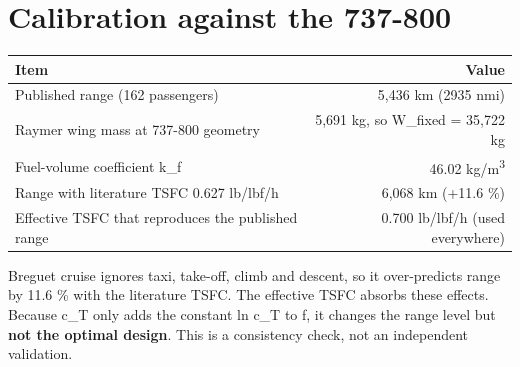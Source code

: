 \documentclass[10pt,a4paper]{article}
\begin{document}
\section{Calibration against the 737-800}
\begin{table}[H]\centering\small
\begin{tabular}{lr}
\toprule
\textbf{Item} & \textbf{Value} \\
\midrule
Published range (162 passengers) & 5,436 km (2935 nmi) \\
Raymer wing mass at 737-800 geometry & 5,691 kg, so W\_fixed = 35,722 kg \\
Fuel-volume coefficient k\_f & 46.02 kg/m\textsuperscript{3} \\
Range with literature TSFC 0.627 lb/lbf/h & 6,068 km (+11.6 \%) \\
Effective TSFC that reproduces the published range & 0.700 lb/lbf/h (used everywhere) \\
\bottomrule
\end{tabular}
\end{table}
Breguet cruise ignores taxi, take-off, climb and descent, so it over-predicts range by 11.6 \% with the literature TSFC. The effective TSFC absorbs these effects. Because c\_T only adds the constant ln c\_T to f, it changes the range level but \textbf{not the optimal design}. This is a consistency check, not an independent validation.
\end{document}
